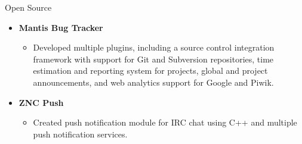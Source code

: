 \documentclass[11pt,oneside]{article}
\newenvironment{ressection}[1]{
	\vspace{8pt}
	{\fontfamily{phv}\selectfont\Large#1}
	\begin{itemize}
	\vspace{3pt}
}{
	\end{itemize}
}
\newcommand{\resitem}[1]{
	\vspace{-4pt}
	\item \begin{flushleft} #1 \end{flushleft}
}
\newcommand{\ressubitem}[1]{
	\vspace{-1pt}
	\item \begin{flushleft} #1 \end{flushleft}
}
\newenvironment{reslist}[1]{
	\resitem{\textbf{#1}}
	\vspace{-2pt}
	\begin{itemize}
}{
	\end{itemize}
}
\begin{document}
\begin{ressection}{Open Source}

	\begin{reslist}{Mantis Bug Tracker}
		\ressubitem{Developed multiple plugins, including a source control integration framework
		with support for Git and Subversion repositories, time estimation and reporting system for projects,
		global and project announcements, and web analytics support for Google and Piwik.}
	\end{reslist}

	\begin{reslist}{ZNC Push}
		\ressubitem{Created push notification module for IRC chat using C++ and multiple push notification services.}
	\end{reslist}



\end{ressection}








\end{document}
